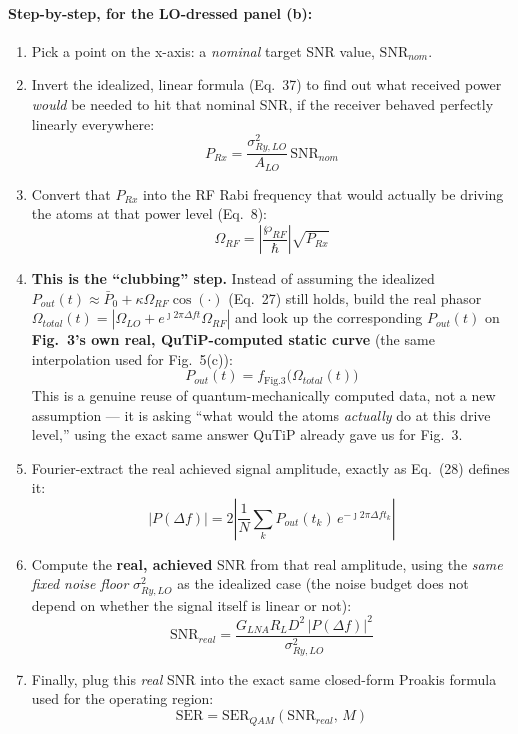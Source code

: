 \documentclass[11pt]{article}
\begin{document}
\paragraph{Step-by-step, for the LO-dressed panel (b):}
\begin{enumerate}
\item Pick a point on the x-axis: a \emph{nominal} target SNR value, $\text{SNR}_{nom}$.
\item Invert the idealized, linear formula (Eq.~37) to find out what received power \emph{would} be needed to hit that nominal SNR, if the receiver behaved perfectly linearly everywhere:
\[
\boxed{P_{Rx} = \frac{\sigma_{Ry,LO}^2}{A_{LO}}\,\text{SNR}_{nom}}
\]
\item Convert that $P_{Rx}$ into the RF Rabi frequency that would actually be driving the atoms at that power level (Eq.~8):
\[
\boxed{\Omega_{RF} = \left|\frac{\wp_{RF}}{\hbar}\right|\sqrt{P_{Rx}}}
\]
\item \textbf{This is the ``clubbing'' step.} Instead of assuming the idealized $P_{out}(t)\approx\bar P_0+\kappa\Omega_{RF}\cos(\cdot)$ (Eq.~27) still holds, build the real phasor $\Omega_{total}(t)=|\Omega_{LO}+e^{\jmath2\pi\Delta f t}\Omega_{RF}|$ and look up the corresponding $P_{out}(t)$ on \textbf{Fig.~3's own real, QuTiP-computed static curve} (the same interpolation used for Fig.~5(c)):
\[
\boxed{P_{out}(t) = f_{\text{Fig.3}}\big(\Omega_{total}(t)\big)}
\]
This is a genuine reuse of quantum-mechanically computed data, not a new assumption --- it is asking ``what would the atoms \emph{actually} do at this drive level,'' using the exact same answer QuTiP already gave us for Fig.~3.
\item Fourier-extract the real achieved signal amplitude, exactly as Eq.~(28) defines it:
\[
\boxed{|P(\Delta f)| = 2\left|\frac1N\sum_k P_{out}(t_k)\,e^{-\jmath2\pi\Delta f t_k}\right|}
\]
\item Compute the \textbf{real, achieved} SNR from that real amplitude, using the \emph{same fixed noise floor} $\sigma_{Ry,LO}^2$ as the idealized case (the noise budget does not depend on whether the signal itself is linear or not):
\[
\boxed{\text{SNR}_{real} = \frac{G_{LNA}R_LD^2\,|P(\Delta f)|^2}{\sigma_{Ry,LO}^2}}
\]
\item Finally, plug this \emph{real} SNR into the exact same closed-form Proakis formula used for the operating region:
\[
\boxed{\text{SER} = \text{SER}_{QAM}(\text{SNR}_{real},\,M)}
\]
\end{enumerate}
\end{document}
